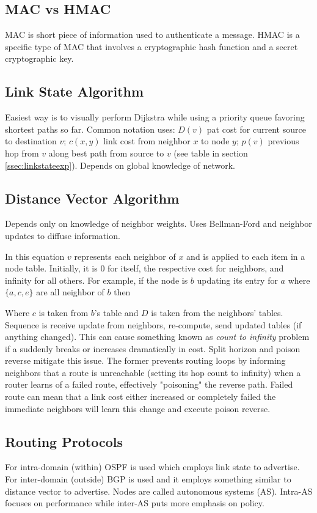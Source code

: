 \subsection{MAC vs HMAC}
MAC is short piece of information used to authenticate a message. HMAC
is a specific type of MAC that involves a cryptographic hash function
and a secret cryptographic key.
\subsection{Link State Algorithm}
Easiest way is to visually perform Dijkstra while using a priority queue
favoring shortest paths so far. Common notation uses: $D(v)$ pat cost
for current source to destination $v$; $c(x,y)$ link cost from neighbor
$x$ to node $y$; $p(v)$ previous hop from $v$ along best path from
source to $v$ (see table in section \ref{ssec:linkstateexp}). Depends on
global knowledge of network.
\subsection{Distance Vector Algorithm}
Depends only on knowledge of neighbor weights. Uses Bellman-Ford and
neighbor updates to diffuse information.


In this equation $v$ represents each neighbor of $x$ and is applied to
each item in a node table. Initially, it is 0 for itself, the respective
cost for neighbors, and infinity for all others. For example, if the
node is $b$ updating its entry for $a$ where $\{a,c,e\}$ are all
neighbor of $b$ then
\begin{scriptsize}
\end{scriptsize}
Where $c$ is taken from $b$'s table and $D$ is taken from the neighbors'
tables. Sequence is receive update from neighbors, re-compute, send
updated tables (if anything changed). This can cause something known as
\textit{count to infinity} problem if a suddenly breaks or increases
dramatically in cost. Split horizon and poison reverse mitigate this
issue. The former prevents routing loops by informing neighbors that a
route is unreachable (setting its hop count to infinity) when a router
learns of a failed route, effectively "poisoning" the reverse path.
Failed route can mean that a link cost either increased or completely
failed the immediate neighbors will learn this change and execute poison
reverse.
\subsection{Routing Protocols}
For intra-domain (within) OSPF is used which employs link state to
advertise. For inter-domain (outside) BGP is used and it employs
something similar to distance vector to advertise. Nodes are called
autonomous systems (AS). Intra-AS focuses on performance while inter-AS
puts more emphasis on policy.

